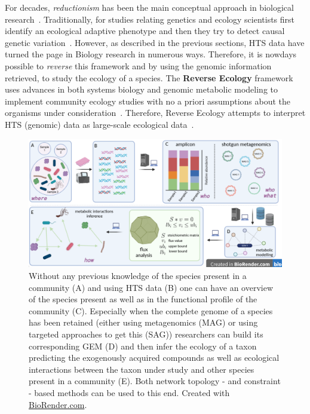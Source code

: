       For decades, \textit{reductionism} has been the main conceptual approach 
      in biological research~\citep{noble2008music}.
      Traditionally, for studies relating genetics and ecology
      scientists first identify an ecological adaptive phenotype 
      and then they try to detect causal genetic variation~\citep{noble2008music}.
      However, as described in the previous sections, HTS data have turned the page in 
      Biology research in numerous ways. 
      Therefore, it is nowdays possible to \textit{reverse} this framework and by 
      using the genomic information retrieved, to study 
      the ecology of a species.
      The \textbf{Reverse Ecology} framework uses advances 
      in both systems biology and genomic metabolic modeling to implement  
      community ecology studies 
      with no a priori assumptions about the organisms under consideration~\citep{cao2016revecor}.
      Therefore, Reverse Ecology 
      attempts to interpret HTS (genomic) data as large-scale ecological data~\citep{levy2012reverse}.

      \begin{figure}[!h]
         \centering
         \includegraphics[width=135mm]{figures/reverse_ecology.png}
         \caption[The \textit{Reverse Ecology} framework.]{Without any previous knowledge of the species present in a community (A) and using HTS data (B) one can have an overview of the species present 
         as well as in the functional profile of the community (C).
         Especially when the complete genome of a species has been retained (either using 
         metagenomics (MAG) or using targeted approaches to get this (SAG))
         researchers can build its corresponding GEM (D) and then 
         infer the ecology of a taxon predicting 
         the exogenously acquired compounds as well as ecological interactions between the taxon under study and other species present in a community (E). 
         Both network topology - and constraint - based methods can be used to this end.
         Created with \href{BioRender.com}{BioRender.com}.
         }
         \label{fig:revecol}
      \end{figure}

